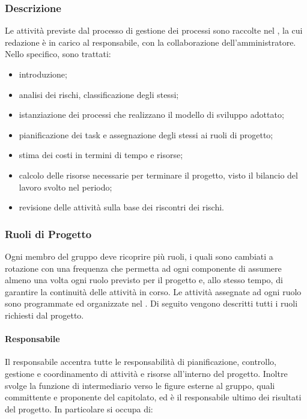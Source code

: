	\subsubsection{Descrizione}
		Le attività previste dal processo di gestione dei processi sono raccolte nel , la cui redazione è in carico al responsabile, con la collaborazione dell'amministratore.
		\newline
		Nello specifico, sono trattati:

		\begin{itemize}
			\item introduzione;
			\item analisi dei rischi, classificazione degli stessi;
			\item istanziazione dei processi che realizzano il modello di sviluppo adottato;
			\item pianificazione dei task e assegnazione degli stessi ai ruoli di progetto;
			\item stima dei costi in termini di tempo e risorse;
			\item calcolo delle risorse necessarie per terminare il progetto, visto il bilancio del lavoro svolto nel periodo;
			\item revisione delle attività sulla base dei riscontri dei rischi.
		\end{itemize}

	\subsubsection{Ruoli di Progetto}

		Ogni membro del gruppo deve ricoprire più ruoli, i quali sono cambiati a rotazione con una frequenza che permetta ad ogni componente di assumere almeno una volta ogni ruolo previsto per il progetto e, allo stesso tempo, di garantire la continuità delle attività in corso.
		\newline
		Le attività assegnate ad ogni ruolo sono programmate ed organizzate nel .
		\newline
		Di seguito vengono descritti tutti i ruoli richiesti dal progetto.

		\paragraph{Responsabile}

			Il responsabile accentra tutte le responsabilità di pianificazione, controllo, gestione e coordinamento di attività e risorse all'interno del progetto. Inoltre svolge la funzione di intermediario verso le figure esterne al gruppo, quali committente e proponente del capitolato, ed è il responsabile ultimo dei risultati del progetto.
			\newline
			In particolare si occupa di:

